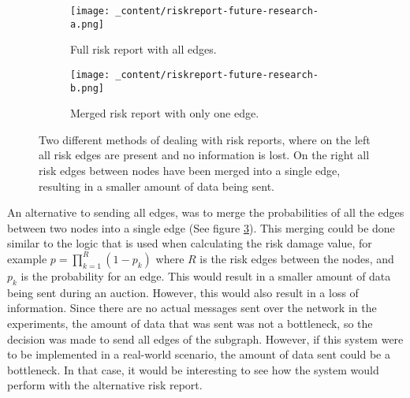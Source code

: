 \begin{figure}[H]
    \centering
    \begin{subfigure}[b]{0.4\textwidth}
        \centering
        \texttt{[image: \_content/riskreport-future-research-a.png]}
        \caption{Full risk report with all edges.}
        \label{fig:riskreport-a}
    \end{subfigure}
    \hspace{0.5cm}
    \begin{subfigure}[b]{0.4\textwidth}
        \centering
        \texttt{[image: \_content/riskreport-future-research-b.png]}
        \caption{Merged risk report with only one edge.}
        \label{fig:riskreport-b}
    \end{subfigure}
    \caption{Two different methods of dealing with risk reports, where on the left all risk edges are present and no information is lost. On the right all risk edges between nodes have been merged into a single edge, resulting in a smaller amount of data being sent.}
\end{figure}


An alternative to sending all edges, was to merge the probabilities of all the edges between two nodes into a single edge (See figure \ref{fig:riskreport-b}). This merging could be done similar to the logic that is used when calculating the risk damage value, for example $p = \prod_{k=1}^{R} (1 - p_{k})$ where $R$ is the risk edges between the nodes, and $p_{k}$ is the probability for an edge. 
This would result in a smaller amount of data being sent during an auction. However, this would also result in a loss of information. Since there are no actual messages sent over the network in the experiments, the amount of data that was sent was not a bottleneck, so the decision was made to send all edges of the subgraph. However, if this system were to be implemented in a real-world scenario, the amount of data sent could be a bottleneck. In that case, it would be interesting to see how the system would perform with the alternative risk report.

